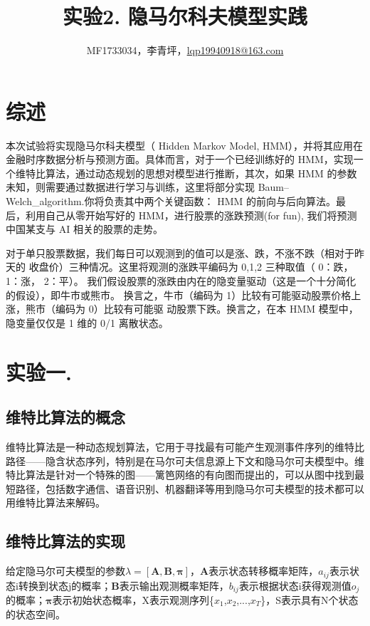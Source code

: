 \documentclass[a4paper,UTF8]{article}
\theoremstyle{definition}
\begin{document}
\title{实验2. 隐马尔科夫模型实践}
\author{MF1733034，李青坪，\url{lqp19940918@163.com}}
\maketitle

\section*{综述}
	本次试验将实现隐马尔科夫模型\cite{周志华2016机器学习}（ Hidden Markov Model, HMM），并将其应⽤在⾦融时序数据分析与预测⽅⾯。具体⽽⾔，对于⼀个已经训练好的 HMM，实现⼀个维特⽐算法，通过动态规划的思想对模型进⾏推断，其次，如果 HMM 的参数未知，则需要通过数据进⾏学习与训练，这⾥将部分实现 Baum–Welch\_algorithm.你将负责其中两个关键函数： HMM 的前向与后向算法。最后，利⽤⾃⼰从零开始写好的 HMM，进⾏股票的涨跌预测(for fun), 我们将预测中国某⽀与 AI 相关的股票的⾛势。
	
	对于单只股票数据，我们每⽇可以观测到的值可以是涨、跌，不涨不跌（相对于昨天的
收盘价）三种情况。这⾥将观测的涨跌平编码为 0,1,2 三种取值（ 0：跌， 1：涨， 2：平）。
我们假设股票的涨跌由内在的隐变量驱动（这是⼀个⼗分简化的假设），即⽜市或熊市。
换⾔之，⽜市（编码为 1）⽐较有可能驱动股票价格上涨，熊市（编码为 0）⽐较有可能驱
动股票下跌。换⾔之，在本 HMM 模型中，隐变量仅仅是 1 维的 0/1 离散状态。
	
\section*{实验一.}
	\subsection*{维特比算法的概念}
		维特比算法是一种动态规划算法，它用于寻找最有可能产生观测事件序列的维特比路径——隐含状态序列，特别是在马尔可夫信息源上下文和隐马尔可夫模型中。维特比算法是针对一个特殊的图——篱笆网络的有向图而提出的，可以从图中找到最短路径，包括数字通信、语音识别、机器翻译等用到隐马尔可夫模型的技术都可以用维特比算法来解码。
	\subsection*{维特比算法的实现}
		给定隐马尔可夫模型的参数$ \lambda =[\textbf{A},\textbf{B},\pmb{\pi}] $，$ \textbf{A} $表示状态转移概率矩阵，$ a_{ij} $表示状态i转换到状态j的概率；$ \textbf{B} $表示输出观测概率矩阵，$ b_{ij} $表示根据状态i获得观测值$ o_j $的概率；$ \pmb{\pi} $表示初始状态概率，X表示观测序列\{$ x_1 $,$ x_2 $,...,$ x_T $\}，S表示具有N个状态的状态空间。
		
\end{document}

